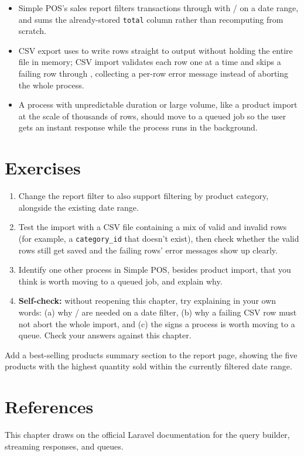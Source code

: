 \begin{itemize}
  \item Simple POS's sales report filters transactions through
     with /
    on a date range, and sums the already-stored \texttt{total} column
    rather than recomputing from scratch.
  \item CSV export uses  to write rows
    straight to output without holding the entire file in memory; CSV
    import validates each row one at a time and skips a failing row
    through , collecting a per-row error message
    instead of aborting the whole process.
  \item A process with unpredictable duration or large volume, like a
    product import at the scale of thousands of rows, should move to a
    queued job so the user gets an instant response while the process
    runs in the background.
\end{itemize}

\section{Exercises}

\begin{enumerate}
  \item Change the report filter to also support filtering by product
    category, alongside the existing date range.
  \item Test the import with a CSV file containing a mix of valid and
    invalid rows (for example, a \texttt{category\_id} that doesn't
    exist), then check whether the valid rows still get saved and the
    failing rows' error messages show up clearly.
  \item Identify one other process in Simple POS, besides product
    import, that you think is worth moving to a queued job, and explain
    why.
  \item \textbf{Self-check:} without reopening this chapter, try
    explaining in your own words: (a) why /
    are needed on a date filter, (b) why a failing CSV row must not
    abort the whole import, and (c) the signs a process is worth moving
    to a queue. Check your answers against this chapter.
\end{enumerate}

\begin{challengebox}
Add a best-selling products summary section to the report page, showing
the five products with the highest quantity sold within the currently
filtered date range.
\end{challengebox}

\section{References}

This chapter draws on the official Laravel documentation
\cite{laraveldocs} for the query builder, streaming responses, and
queues.
